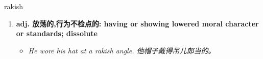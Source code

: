 
\begin{frame}
{\huge rakish}
\begin{center}
\begin{enumerate}\Large
  \item \textbf{adj. 放荡的,行为不检点的: having or showing lowered moral character or standards; dissolute}
  \begin{itemize}
    \item \em{\Large{He wore his hat at a rakish angle. 他帽子戴得吊儿郎当的。}}
  \end{itemize}
\end{enumerate}
\end{center}
\end{frame}
